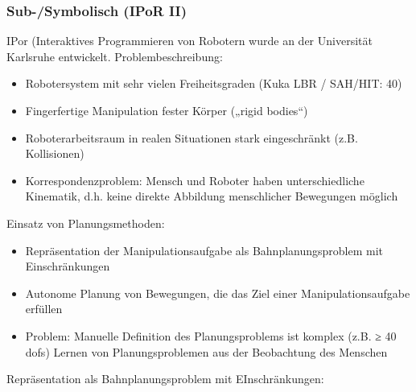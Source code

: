 \subsubsection*{Sub-/Symbolisch (IPoR II)}
IPor (Interaktives Programmieren von Robotern wurde an der Universität Karlsruhe entwickelt. 
Problembeschreibung:
\begin{itemize}
\item Robotersystem mit sehr vielen Freiheitsgraden (Kuka LBR / SAH/HIT: 40)
\item  Fingerfertige Manipulation fester Körper („rigid bodies“)
\item Roboterarbeitsraum in realen Situationen stark eingeschränkt (z.B.
Kollisionen)
\item  \Gu Korrespondenzproblem\Go: Mensch und Roboter haben unterschiedliche
Kinematik, d.h. keine direkte Abbildung menschlicher Bewegungen möglich
\end{itemize}
Einsatz von Planungsmethoden:
\begin{itemize}
\item Repräsentation der Manipulationsaufgabe als Bahnplanungsproblem mit Einschränkungen
\item Autonome Planung von Bewegungen, die das Ziel einer Manipulationsaufgabe erfüllen
\item Problem: Manuelle Definition des Planungsproblems ist komplex (z.B. ≥ 40 dofs)
\ita Lernen von Planungsproblemen aus der Beobachtung des Menschen
\end{itemize}
Repräsentation als Bahnplanungsproblem mit EInschränkungen:
